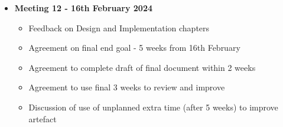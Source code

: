 \begin{itemize}
\begin{itemize}
    \end{itemize}
    \item \textbf{Meeting 12 - 16th February 2024}
    \begin{itemize}
        \item Feedback on Design and Implementation chapters
        \item Agreement on final end goal - 5 weeks from 16th February
        \item Agreement to complete draft of final document within 2 weeks
        \item Agreement to use final 3 weeks to review and improve
        \item Discussion of use of unplanned extra time (after 5 weeks) to improve artefact
    \end{itemize}
\end{itemize}
